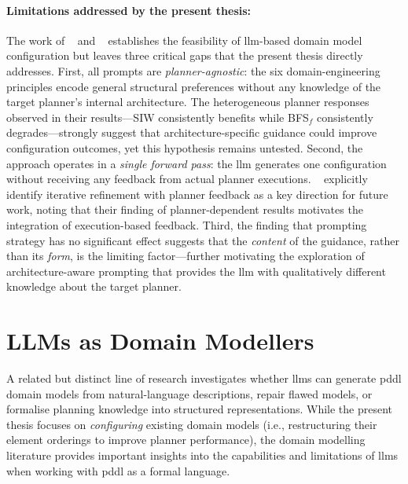 \paragraph{Limitations addressed by the present thesis:}
The work of \citeauthor{Elis2025}~\cite{Elis2025} and \citeauthor{Georgievski2025}~\cite{Georgievski2025} establishes the feasibility of \gls{llm}-based domain model configuration but leaves three critical gaps that the present thesis directly addresses.
First, all prompts are \emph{planner-agnostic}: the six domain-engineering principles encode general structural preferences without any knowledge of the target planner's internal architecture.
The heterogeneous planner responses observed in their results---SIW consistently benefits while BFS$_f$ consistently degrades---strongly suggest that architecture-specific guidance could improve configuration outcomes, yet this hypothesis remains untested.
Second, the approach operates in a \emph{single forward pass}: the \gls{llm} generates one configuration without receiving any feedback from actual planner executions.
\citeauthor{Georgievski2025}~\cite{Georgievski2025} explicitly identify iterative refinement with planner feedback as a key direction for future work, noting that their finding of planner-dependent results motivates the integration of execution-based feedback.
Third, the finding that prompting strategy has no significant effect suggests that the \emph{content} of the guidance, rather than its \emph{form}, is the limiting factor---further motivating the exploration of architecture-aware prompting that provides the \gls{llm} with qualitatively different knowledge about the target planner.

\section{LLMs as Domain Modellers}
\label{sec:rw:llms_domain_modellers}

A related but distinct line of research investigates whether \glspl{llm} can generate \gls{pddl} domain models from natural-language descriptions, repair flawed models, or formalise planning knowledge into structured representations.
While the present thesis focuses on \emph{configuring} existing domain models (i.e., restructuring their element orderings to improve planner performance), the domain modelling literature provides important insights into the capabilities and limitations of \glspl{llm} when working with \gls{pddl} as a formal language.

